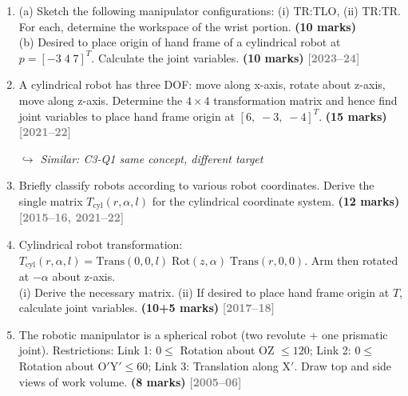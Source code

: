 \documentclass[12pt,a3paper]{article}
\newcommand{\yr}[1]{\hfill\textcolor{gray}{\small\textbf{[#1]}}}
\newcommand{\mk}[1]{\textcolor{orange!70!black}{\small\textbf{(#1 marks)}}}
\newcommand{\variant}[1]{\par\vspace{1pt}\textcolor{blue!50!black}%
  {\footnotesize\textit{$\hookrightarrow$ Similar: #1}}}
\begin{document}
\begin{enumerate}
\item \label{qlabel:C3-Q1}
(a) Sketch the following manipulator configurations: (i) TR:TLO, (ii) TR:TR. For each, determine the workspace of the wrist portion. \mk{10}\\
(b) Desired to place origin of hand frame of a cylindrical robot at $p = [-3\;4\;7]^T$. Calculate the joint variables. \mk{10}
\yr{2023--24}





\item \label{qlabel:C3-Q2}
A cylindrical robot has three DOF: move along x-axis, rotate about z-axis, move along z-axis. Determine the $4\times4$ transformation matrix and hence find joint variables to place hand frame origin at $[6,\;-3,\;-4]^T$. \mk{15}
\yr{2021--22} \variant{C3-Q1 same concept, different target}





\item \label{qlabel:C3-Q3}
Briefly classify robots according to various robot coordinates. Derive
the single matrix $T_{\mathrm{cyl}}(r,\alpha,l)$ for the cylindrical
coordinate system. \mk{12}
\yr{2015--16, 2021--22}




\item \label{qlabel:C3-Q4}
Cylindrical robot transformation:
$T_{\mathrm{cyl}}(r,\alpha,l) = \mathrm{Trans}(0,0,l)\;\mathrm{Rot}(z,\alpha)\;\mathrm{Trans}(r,0,0)$.
Arm then rotated at $-\alpha$ about z-axis.\\
(i) Derive the necessary matrix. (ii) If desired to place hand frame
origin at $T$, calculate joint variables. \mk{10+5}
\yr{2017--18}




\item \label{qlabel:C3-Q6}
The robotic manipulator is a spherical robot (two revolute + one prismatic joint). Restrictions: Link 1: $0 \leq$ Rotation about OZ $\leq 120$\textdegree; Link 2: $0 \leq$ Rotation about O$'$Y$' \leq 60$\textdegree; Link 3: Translation along X$'$. Draw top and side views of work volume. \mk{8}
\yr{2005--06}


\end{enumerate}
\end{document}
